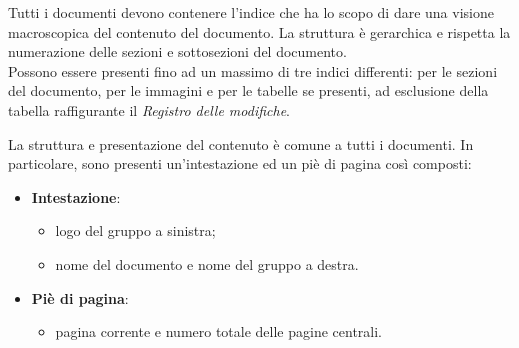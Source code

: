 	Tutti i documenti devono contenere l'indice che ha lo scopo di dare una visione macroscopica del contenuto del documento. La struttura è gerarchica e rispetta la numerazione delle sezioni e sottosezioni del documento. \\
	Possono essere presenti fino ad un massimo di tre indici differenti: per le sezioni del documento, per le immagini e per le tabelle se presenti, ad esclusione della tabella raffigurante il \textit{Registro delle modifiche}.
	
	La struttura e presentazione del contenuto è comune a tutti i documenti. In particolare, sono presenti un'intestazione ed un piè di pagina così composti:
	\begin{itemize}
		\item \textbf{Intestazione}:
		\begin{itemize}
			\item logo del gruppo a sinistra;
			\item nome del documento e nome del gruppo a destra.
		\end{itemize}
		\item \textbf{Piè di pagina}:
		\begin{itemize}
			\item pagina corrente e numero totale delle pagine centrali.
		\end{itemize}
	\end{itemize}
	
